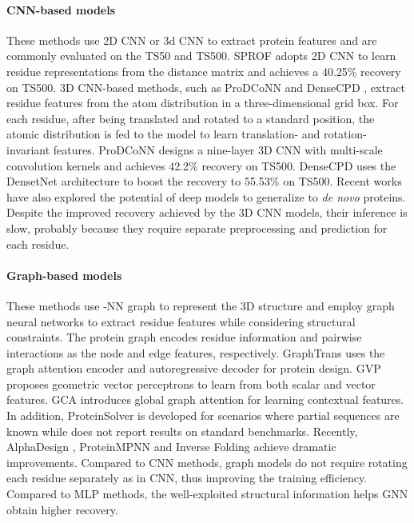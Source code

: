 \documentclass{article}
\begin{document}
\paragraph{CNN-based models} These methods use 2D CNN or 3d CNN to extract protein features \citep{torng20173d, NIPS2017_1113d7a7, NEURIPS2018_488e4104, zhang2020prodconn, qi2020densecpd, chen2019improve} and are commonly evaluated on the TS50 and TS500. SPROF \citep{chen2019improve} adopts 2D CNN to learn residue representations from the distance matrix and achieves a 40.25\% recovery on TS500. 3D CNN-based methods, such as ProDCoNN \citep{zhang2020prodconn} and  DenseCPD \citep{qi2020densecpd}, extract residue features from the atom distribution in a three-dimensional grid box. For each residue, after being translated and rotated to a standard position, the atomic distribution is fed to the model to learn translation- and rotation-invariant features. ProDCoNN \citep{zhang2020prodconn} designs a nine-layer 3D CNN with multi-scale convolution kernels and achieves 42.2\% recovery on TS500. DenseCPD \citep{qi2020densecpd} uses the DensetNet architecture \citep{huang2017densely} to boost the recovery to 55.53\% on TS500. Recent works \citep{anand2022protein} have also explored the potential of deep models to generalize to \textit{de novo} proteins. Despite the improved recovery achieved by the 3D CNN models, their inference is slow, probably because they require separate preprocessing and prediction for each residue.  
  

\vspace{-2mm}
\paragraph{Graph-based models} These methods use -NN graph to represent the 3D structure and employ graph neural networks \citep{defferrard2016convolutional,kipf2016semi,velivckovic2017graph,zhou2020graph,zhang2020deep, gao2022cosp, tan2022target, gao2022semiretro} to extract residue features while considering structural constraints. The protein graph encodes residue information and pairwise interactions as the node and edge features, respectively. GraphTrans \citep{ingraham2019generative} uses the graph attention encoder and autoregressive decoder for protein design. GVP \citep{jing2020learning} proposes geometric vector perceptrons to learn from both scalar and vector features. GCA \citep{tan2022generative} introduces global graph attention for learning contextual features. In addition, ProteinSolver \citep{strokach2020fast} is developed for scenarios where partial sequences are known while does not report results on standard benchmarks. Recently, AlphaDesign \citep{gao2022alphadesign}, ProteinMPNN \citep{dauparas2022robust} and Inverse Folding \citep{hsu2022learning} achieve dramatic improvements. Compared to CNN methods, graph models do not require rotating each residue separately as in CNN, thus improving the training efficiency. Compared to MLP methods, the well-exploited structural information helps GNN obtain higher recovery. 
\end{document}
